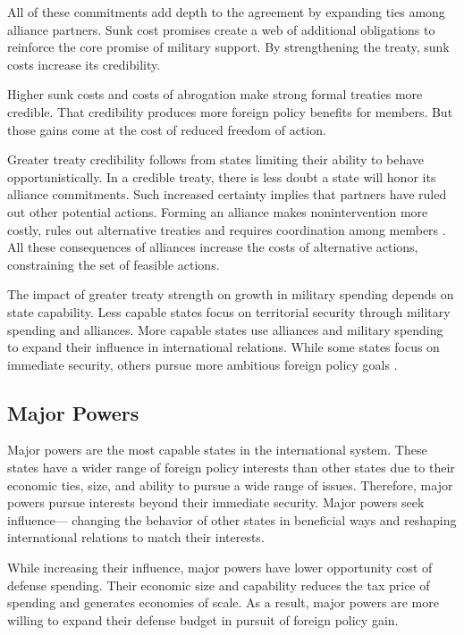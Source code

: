 \documentclass[12pt]{article}
\begin{document}
All of these commitments add depth to the agreement by expanding ties among alliance partners. 
Sunk cost promises create a web of additional obligations to reinforce the core promise of military support.  
By strengthening the treaty, sunk costs increase its credibility. 


Higher sunk costs and costs of abrogation make strong formal treaties more credible.
That credibility produces more foreign policy benefits for members. 
But those gains come at the cost of reduced freedom of action. 


Greater treaty credibility follows from states limiting their ability to behave opportunistically. 
In a credible treaty, there is less doubt a state will honor its alliance commitments. 
Such increased certainty implies that partners have ruled out other potential actions. 
Forming an alliance makes nonintervention more costly, rules out alternative treaties and requires coordination among members \citep{Snyder1997}. 
All these consequences of alliances increase the costs of alternative actions, constraining the set of feasible actions. 


The impact of greater treaty strength on growth in military spending depends on state capability. 
Less capable states focus on territorial security through military spending and alliances. 
More capable states use alliances and military spending to expand their influence in international relations. 
While some states focus on immediate security, others pursue more ambitious foreign policy goals \citep{Fordham2011, MarkowitzFariss2017}. 


\subsection{Major Powers} 


Major powers are the most capable states in the international system. 
These states have a wider range of foreign policy interests than other states due to their economic ties, size, and ability to pursue a wide range of issues. 
Therefore, major powers pursue interests beyond their immediate security. 
Major powers seek influence--- changing the behavior of other states in beneficial ways and reshaping international relations to match their interests. 


While increasing their influence, major powers have lower opportunity cost of defense spending. 
Their economic size and capability reduces the tax price of spending and generates economies of scale. 
As a result, major powers are more willing to expand their defense budget in pursuit of foreign policy gain.  
\end{document}
